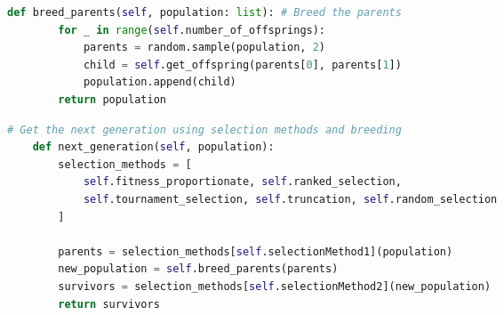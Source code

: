\documentclass[12pt]{report} %
\begin{document}
\vspace{1cm}

\begin{changemargin}{-3cm}{-2cm}

	\begin{lstlisting}[language=python, caption= {Select two parents and add their offspring to the population}, captionpos=b]
    def breed_parents(self, population: list): # Breed the parents
        for _ in range(self.number_of_offsprings):
            parents = random.sample(population, 2)
            child = self.get_offspring(parents[0], parents[1])
            population.append(child)
        return population
\end{lstlisting}
\end{changemargin}

\vspace{1cm}

\begin{changemargin}{-3cm}{-2cm}

	\begin{lstlisting}[language=python, caption= {First we select parents using the selection method. Then we breed the parents to get the offsprings. The length of population will increase because of this. Then we select survivors using the selection method. The length of population will now equal population size}]
    # Get the next generation using selection methods and breeding
    def next_generation(self, population):
        selection_methods = [
            self.fitness_proportionate, self.ranked_selection,
            self.tournament_selection, self.truncation, self.random_selection
        ]

        parents = selection_methods[self.selectionMethod1](population)
        new_population = self.breed_parents(parents)
        survivors = selection_methods[self.selectionMethod2](new_population)
        return survivors
\end{lstlisting}
\end{changemargin}


\vspace{1cm}
\end{document}

